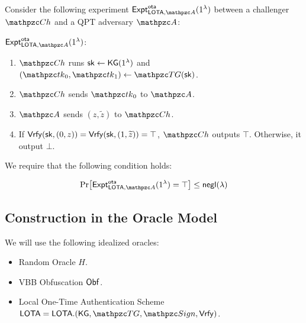 \begin{definition}
Consider the following experiment $\expa{\LOTA,
\qA}{ota}(1^\secp)$ between a challenger $\qCh$ and a QPT adversary
$\qA$:
\begin{description}
\item \underline{$\expa{\LOTA, \qA}{ota}(1^\secp)$}:
\begin{enumerate}
\item $\qCh$ runs $\mathsf{sk} \leftarrow \mathsf{KG}(1^\lambda)$ and
$(\qtk_0, \qtk_1) \gets \TG(\sk)$.
\item $\qCh$ sends $\qtk_0$ to $\qA$.
\item $\qA$ sends $(z, \widetilde{z})$ to $\qCh$.
\item If $\mathsf{Vrfy}(\mathsf{sk}, (0, z)) = \mathsf{Vrfy}(\mathsf{sk}, (1, \widetilde{z})) =
\top$, $\qCh$ outputs $\top$. Otherwise, it output $\bot$.
\end{enumerate}
\end{description}

We require that the following condition holds:

$$\Pr[\expa{\LOTA, \qA}{ota}(1^\secp) = \top] \le \negl(\secp)$$
\end{definition}


\subsection{Construction in the Oracle Model}

We will use the following idealized oracles:
\begin{itemize}
\item Random Oracle $H$.
\item VBB Obfuscation $\mathsf{Obf}$.
\item Local One-Time Authentication Scheme $\LOTA = \LOTA.(\KG, \TG,
    \qSign,
\Vrfy)$.
\end{itemize}

